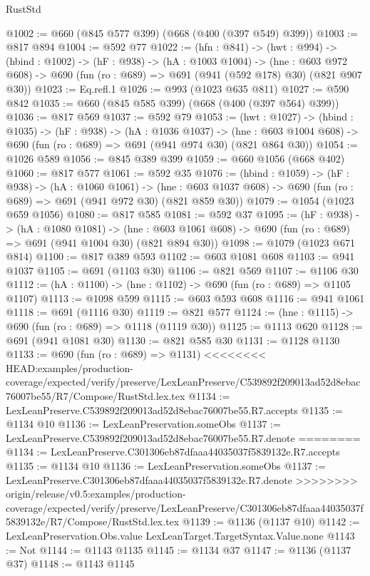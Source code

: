 \begin{lexlean}{RustStd}
\begin{coremodule}
{\begin{coremodule}
@1002 := @660 (@845 @577 @399) (@668 (@400 (@397 @549) @399))
@1003 := @817 @894
@1004 := @592 @77
@1022 := (hfn : @841) ->
  (hwt : @994) ->
  (hbind : @1002) ->
  (hF : @938) ->
  (hA : @1003 @1004) ->
  (hne : @603 @972 @608) -> @690 (fun (ro : @689) => @691 (@941 (@592 @178) @30) (@821 @907 @30))
@1023 := Eq.refl.{1}
@1026 := @993 (@1023 @635 @811)
@1027 := @590 @842
@1035 := @660 (@845 @585 @399) (@668 (@400 (@397 @564) @399))
@1036 := @817 @569
@1037 := @592 @79
@1053 := (hwt : @1027) ->
  (hbind : @1035) ->
  (hF : @938) ->
  (hA : @1036 @1037) ->
  (hne : @603 @1004 @608) -> @690 (fun (ro : @689) => @691 (@941 @974 @30) (@821 @864 @30))
@1054 := @1026 @589
@1056 := @845 @389 @399
@1059 := @660 @1056 (@668 @402)
@1060 := @817 @577
@1061 := @592 @35
@1076 := (hbind : @1059) ->
  (hF : @938) ->
  (hA : @1060 @1061) ->
  (hne : @603 @1037 @608) -> @690 (fun (ro : @689) => @691 (@941 @972 @30) (@821 @859 @30))
@1079 := @1054 (@1023 @659 @1056)
@1080 := @817 @585
@1081 := @592 @37
@1095 := (hF : @938) ->
  (hA : @1080 @1081) ->
  (hne : @603 @1061 @608) -> @690 (fun (ro : @689) => @691 (@941 @1004 @30) (@821 @894 @30))
@1098 := @1079 (@1023 @671 @814)
@1100 := @817 @389 @593
@1102 := @603 @1081 @608
@1103 := @941 @1037
@1105 := @691 (@1103 @30)
@1106 := @821 @569
@1107 := @1106 @30
@1112 := (hA : @1100) -> (hne : @1102) -> @690 (fun (ro : @689) => @1105 @1107)
@1113 := @1098 @599
@1115 := @603 @593 @608
@1116 := @941 @1061
@1118 := @691 (@1116 @30)
@1119 := @821 @577
@1124 := (hne : @1115) -> @690 (fun (ro : @689) => @1118 (@1119 @30))
@1125 := @1113 @620
@1128 := @691 (@941 @1081 @30)
@1130 := @821 @585 @30
@1131 := @1128 @1130
@1133 := @690 (fun (ro : @689) => @1131)
<<<<<<<< HEAD:examples/production-coverage/expected/verify/preserve/LexLeanPreserve/C539892f209013ad52d8ebac76007be55/R7/Compose/RustStd.lex.tex
@1134 := LexLeanPreserve.C539892f209013ad52d8ebac76007be55.R7.accepts
@1135 := @1134 @10
@1136 := LexLeanPreservation.someObs
@1137 := LexLeanPreserve.C539892f209013ad52d8ebac76007be55.R7.denote
========
@1134 := LexLeanPreserve.C301306eb87dfaaa44035037f5839132e.R7.accepts
@1135 := @1134 @10
@1136 := LexLeanPreservation.someObs
@1137 := LexLeanPreserve.C301306eb87dfaaa44035037f5839132e.R7.denote
>>>>>>>> origin/release/v0.5:examples/production-coverage/expected/verify/preserve/LexLeanPreserve/C301306eb87dfaaa44035037f5839132e/R7/Compose/RustStd.lex.tex
@1139 := @1136 (@1137 @10)
@1142 := LexLeanPreservation.Obs.value LexLeanTarget.TargetSyntax.Value.none
@1143 := Not
@1144 := @1143 @1135
@1145 := @1134 @37
@1147 := @1136 (@1137 @37)
@1148 := @1143 @1145

\end{coremodule}}
\end{coremodule}
\end{lexlean}
